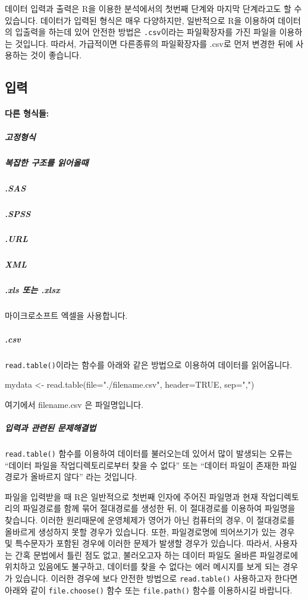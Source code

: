 \documentclass{report}
\begin{document}
데이터 입력과 출력은 R을 이용한 분석에서의 첫번째 단계와 마지막 단계라고도 할 수 있습니다. 
데이터가 입력된 형식은 매우 다양하지만,  일반적으로 R을 이용하여 데이터의 입출력을 하는데 있어 안전한 방법은 \texttt{.csv}이라는 파일확장자를 가진 파일을 이용하는 것입니다.
따라서, 가급적이면 다른종류의 파일확장자를 .csv로 먼저 변경한 뒤에 사용하는 것이 좋습니다. 

\subsection{입력}

\paragraph{다른 형식들: }

\subparagraph{고정형식}

\subparagraph{복잡한 구조를 읽어올때}

\subparagraph{.SAS}

\subparagraph{.SPSS}

\subparagraph{.URL}

\subparagraph{XML}

\subparagraph{.xls 또는 .xlsx}
마이크로소프트 엑셀을 사용합니다. 

\subparagraph{.csv}

\texttt{read.table()}이라는 함수를 아래와 같은 방법으로 이용하여 데이터를 읽어옵니다.

\begin{Schunk}
\begin{Soutput}
mydata <- read.table(file="./filename.csv", header=TRUE, sep=",")
\end{Soutput}
\end{Schunk}

여기에서 filename.csv 은 파일명입니다.

\subparagraph{입력과 관련된 문제해결법}

\texttt{read.table()} 함수를 이용하여 데이터를 불러오는데 있어서 많이 발생되는 오류는 ``데이터 파일을 작업디렉토리로부터 찾을 수 없다'' 또는 ``데이터 파일이 존재한 파일경로가 올바르지 않다'' 라는 것입니다. 

파일을 입력받을 때 R은 일반적으로 첫번째 인자에 주어진 파일명과 현재 작업디렉토리의 파일경로를 함께 묶어 절대경로를 생성한 뒤, 이 절대경로를 이용하여 파일명을 찾습니다. 
이러한 원리때문에 운영체제가 영어가 아닌 컴퓨터의 경우, 이 절대경로를 올바르게 생성하지 못할 경우가 있습니다. 
또한, 파일경로명에 띄어쓰기가 있는 경우 및 특수문자가 포함된 경우에 이러한 문제가 발생할 경우가 있습니다. 
따라서, 사용자는 간혹 문법에서 틀린 점도 없고, 불러오고자 하는 데이터 파일도 올바른 파일경로에 위치하고 있음에도 불구하고, 데이터를 찾을 수 없다는 에러 메시지를 보게 되는 경우가 있습니다. 
이러한 경우에 보다 안전한 방법으로 \texttt{read.table()} 사용하고자 한다면 아래와 같이 \texttt{file.choose()} 함수 또는 \texttt{file.path()} 함수를 이용하시길 바랍니다.
\end{document}
